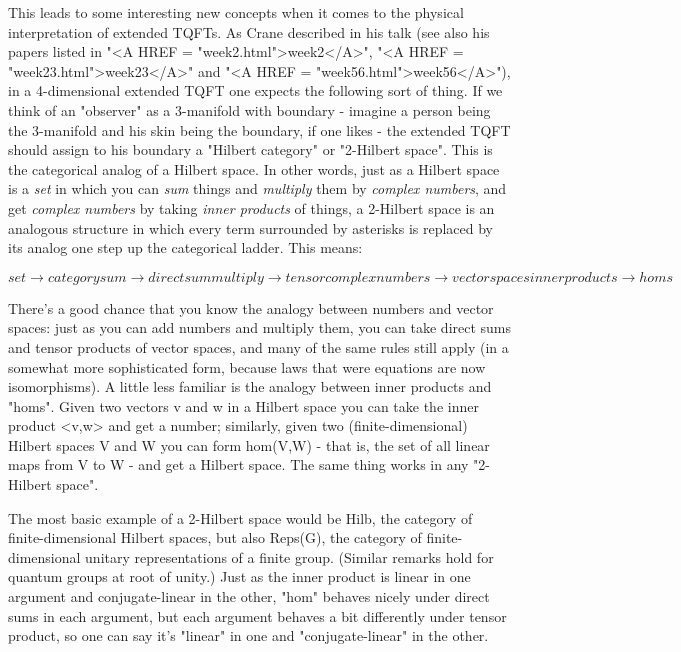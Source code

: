 This leads to some interesting new concepts when it comes to the physical
interpretation of extended TQFTs.   As Crane described in his talk
(see also his papers listed in "<A HREF = "week2.html">week2</A>", "<A HREF = "week23.html">week23</A>" and "<A HREF = "week56.html">week56</A>"), in a 
4-dimensional extended TQFT one expects the following sort of thing.  
If we think of an "observer" as a 3-manifold with boundary - 
imagine a person being the 3-manifold and his skin being the 
boundary, if one likes - the extended TQFT should assign to his boundary a 
"Hilbert category" or "2-Hilbert space".   This is the categorical analog of a
Hilbert space.  In other words, just as a Hilbert space is a \emph{set} 
in which 
you can \emph{sum} things and \emph{multiply} them 
by \emph{complex numbers}, and 
get \emph{complex numbers} by taking \emph{inner products} of things, a 
2-Hilbert space is an analogous structure in which every term 
surrounded by asterisks is replaced by its analog
one step up the categorical ladder.  This means:


$$

set             \to  category
sum             \to  direct sum
multiply        \to  tensor
complex numbers \to  vector spaces
inner products  \to  homs
$$
    

There's a good chance that you know the analogy between numbers and vector
spaces: just as you can add numbers and multiply them, you can take direct sums
and tensor products of vector spaces, and many of the same rules still 
apply (in a somewhat more sophisticated form, because laws that were 
equations are now isomorphisms).  A little less familiar is the 
analogy between inner products and "homs".  Given two vectors v and w in a 
Hilbert space you can take the inner product <v,w> and get a number; 
similarly, given two (finite-dimensional) Hilbert 
spaces V and W you can form hom(V,W) - that is, the set of all linear 
maps from V to W - and get a Hilbert space.  The same thing works in any 
"2-Hilbert space".  

The most basic example of a 2-Hilbert space would be Hilb, the category of 
finite-dimensional Hilbert spaces, but also Reps(G), the category of finite-
dimensional unitary representations of a finite group.  (Similar remarks hold 
for quantum groups at root of unity.)  Just as the inner product is linear 
in one argument and conjugate-linear in the other, "hom" behaves nicely 
under direct sums in each argument, but each argument behaves a bit 
differently under tensor product, so one can say it's "linear" in 
one and "conjugate-linear" in the other.  
      
